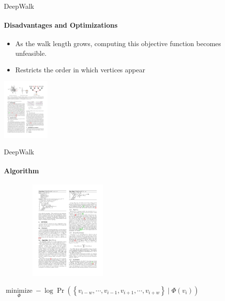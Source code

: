 \documentclass{beamer}
\begin{document}
\begin{frame}{DeepWalk}
    \framesubtitle{Disadvantages and Optimizations}
    \begin{itemize}
        \item As the walk length grows, computing this objective function becomes unfeasible.
        \item Restricts the order in which vertices appear
    \end{itemize}
    \centering\includegraphics[height=3.1cm]{DeepWalk_3.pdf}
\end{frame}
\begin{frame}{DeepWalk}
    \framesubtitle{Algorithm}
    \centering\includegraphics[height=5cm, width=7cm]{DeepWalk_4.pdf}
    \begin{corollary}
        $\underset{\Phi}{\operatorname{minimize}}-\log \operatorname{Pr}\left(\left\{v_{i-w}, \cdots, v_{i-1}, v_{i+1}, \cdots, v_{i+w}\right\} \mid \Phi\left(v_{i}\right)\right)$
    \end{corollary}
\end{frame}

\end{document}

